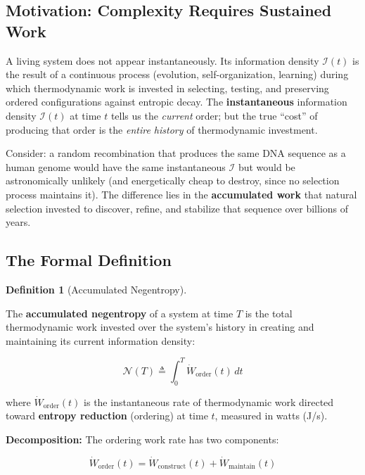 \documentclass[11pt]{article}
\theoremstyle{plain}
\theoremstyle{definition}
\newtheorem{definition}{Definition}
\theoremstyle{remark}
\let\origsubsection\subsection
\renewcommand{\subsection}{\needspace{7\baselineskip}\origsubsection}
\begin{document}
\subsection{Motivation: Complexity Requires Sustained
Work}\label{motivation-complexity-requires-sustained-work}

A living system does not appear instantaneously. Its information density
\(\mathcal{I}(t)\) is the result of a continuous process (evolution,
self-organization, learning) during which thermodynamic work is invested
in selecting, testing, and preserving ordered configurations against
entropic decay. The \textbf{instantaneous} information density
\(\mathcal{I}(t)\) at time \(t\) tells us the \emph{current} order; but
the true ``cost'' of producing that order is the \emph{entire history}
of thermodynamic investment.

Consider: a random recombination that produces the same DNA sequence as
a human genome would have the same instantaneous \(\mathcal{I}\) but
would be astronomically unlikely (and energetically cheap to destroy,
since no selection process maintains it). The difference lies in the
\textbf{accumulated work} that natural selection invested to discover,
refine, and stabilize that sequence over billions of years.

\subsection{The Formal Definition}\label{the-formal-definition}

\begin{definition}[Accumulated Negentropy]
\label{def-accumulated-negentropy}

The \textbf{accumulated negentropy} of a system at time $T$ is the total thermodynamic work invested over the system's history in creating and maintaining its current information density:

$$\mathcal{N}(T) \triangleq \int_0^T \dot{W}_{\text{order}}(t) \, dt$$

where $\dot{W}_{\text{order}}(t)$ is the instantaneous rate of thermodynamic work directed toward \textbf{entropy reduction} (ordering) at time $t$, measured in watts (J/s).
\end{definition}

\textbf{Decomposition:} The ordering work rate has two components:

\[\dot{W}_{\text{order}}(t) = \dot{W}_{\text{construct}}(t) + \dot{W}_{\text{maintain}}(t)\]
\end{document}
